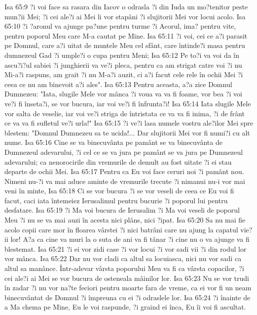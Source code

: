 Isa 65:9  ?i voi face sa rasara din Iacov o odrasla ?i din Iuda un mo?tenitor peste mun?ii Mei; ?i cei ale?i ai Mei li vor stapâni ?i slujitorii Mei vor locui acolo.
Isa 65:10  ?i ?aronul va ajunge pa?une pentru turme ?i Acorul, ima? pentru vite, pentru poporul Meu care M-a cautat pe Mine.
Isa 65:11  ?i voi, cei ce a?i parasit pe Domnul, care a?i uitat de muntele Meu cel sfânt, care întinde?i masa pentru dumnezeul Gad ?i umple?i o cupa pentru Meni;
Isa 65:12  Pe to?i va voi da în ascu?i?ul sabiei ?i junghierii va ve?i pleca, pentru ca am strigat catre voi ?i nu Mi-a?i raspuns, am grait ?i nu M-a?i auzit, ci a?i facut cele rele în ochii Mei ?i ceea ce nu am binevoit a?i ales".
Isa 65:13  Pentru aceasta, a?a zice Domnul Dumnezeu: "Iata, slugile Mele vor mânca ?i voua va va fi foame, vor bea ?i voi ve?i fi înseta?i, se vor bucura, iar voi ve?i fi înfrunta?i!
Isa 65:14  Iata slugile Mele vor salta de veselie, iar voi ve?i striga de întristata ce va va fi inima, ?i de frânt ce va va fi sufletul ve?i urla!"
Isa 65:15  ?i ve?i lasa numele vostru ale?ilor Mei spre blestem: "Domnul Dumnezeu sa te ucida!... Dar slujitorii Mei vor fi numi?i cu alt nume.
Isa 65:16  Cine se va binecuvânta pe pamânt se va binecuvânta de Dumnezeul adevarului, ?i cel ce se va jura pe pamânt se va jura pe Dumnezeul adevarului; ca nenorocirile din vremurile de demult au fost uitate ?i ei stau departe de ochii Mei.
Isa 65:17  Pentru ca Eu voi face ceruri noi ?i pamânt nou. Nimeni nu-?i va mai aduce aminte de vremurile trecute ?i nimanui nu-i vor mai veni în minte,
Isa 65:18  Ci se vor bucura ?i se vor veseli de ceea ce Eu voi fi facut, caci iata întemeiez Ierusalimul pentru bucurie ?i poporul lui pentru desfatare.
Isa 65:19  ?i Ma voi bucura de Ierusalim ?i Ma voi veseli de poporul Meu ?i nu se va mai auzi în acesta nici plâns, nici ?ipat.
Isa 65:20  Sa nu mai fie acolo copii care mor în floarea vârstei ?i nici batrâni care nu ajung la capatul vie?ii lor! A?a ca cine va muri la o suta de ani va fi tânar ?i cine nu o va ajunge va fi blestemat.
Isa 65:21  ?i ei vor zidi case ?i vor locui ?i vor sadi vii ?i din rodul lor vor mânca.
Isa 65:22  Dar nu vor cladi ca altul sa locuiasca, nici nu vor sadi ca altul sa manânce. Într-adevar vârsta poporului Meu va fi ca vârsta copacilor, ?i cei ale?i ai Mei se vor bucura de osteneala mâinilor lor.
Isa 65:23  Nu se vor trudi în zadar ?i nu vor na?te feciori pentru moarte fara de vreme, ca ei vor fi un neam binecuvântat de Domnul ?i împreuna cu ei ?i odraslele lor.
Isa 65:24  ?i înainte de a Ma chema pe Mine, Eu le voi raspunde, ?i graind ei înca, Eu îi voi fi ascultat.
